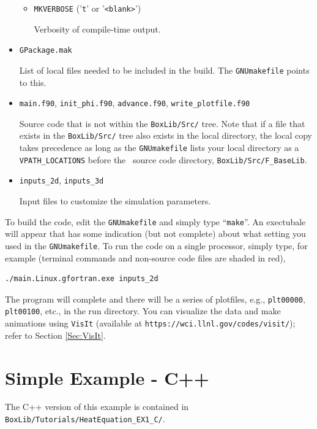 \begin{itemize}
\begin{itemize}
    \item {\tt MKVERBOSE} ('{\tt t}' or '{\tt <blank>}')

    Verbosity of compile-time output.

  \end{itemize}

\item {\tt GPackage.mak}

List of local files needed to be included in the build.  The {\tt GNUmakefile} points to this.

\item {\tt main.f90}, {\tt init\_phi.f90}, {\tt advance.f90}, {\tt write\_plotfile.f90}

Source code that is not within the {\tt BoxLib/Src/} tree.  Note that 
if a file that exists in the
{\tt BoxLib/Src/} tree also exists in the local directory, the local copy takes precedence
as long as the {\tt GNUmakefile} lists your local directory as a {\tt VPATH\_LOCATIONS} 
before the \BoxLib\ source code directory, {\tt BoxLib/Src/F\_BaseLib}.

\item {\tt inputs\_2d}, {\tt inputs\_3d}

Input files to customize the simulation parameters.

\end{itemize}

To build the code, edit the {\tt GNUmakefile} and simply type ``{\tt make}''.  An 
exectubale will appear that has some indication (but not complete)
about what setting you used in the {\tt GNUmakefile}.  To run the code on a single processor,
simply type, for example (terminal commands and non-source code files are shaded in red),
\begin{lstlisting}[backgroundcolor=\color{light-red}]
./main.Linux.gfortran.exe inputs_2d
\end{lstlisting}
The program will complete and there will be a series of plotfiles, e.g., {\tt plt00000}, 
{\tt plt00100}, etc., in the run directory.  You can visualize the data 
and make animations using {\tt VisIt} (available at {\tt https://wci.llnl.gov/codes/visit/});
refer to Section \ref{Sec:VisIt}.

\section{Simple Example - C++}
The C++ version of this example is contained in {\tt BoxLib/Tutorials/HeatEquation\_EX1\_C/}.

